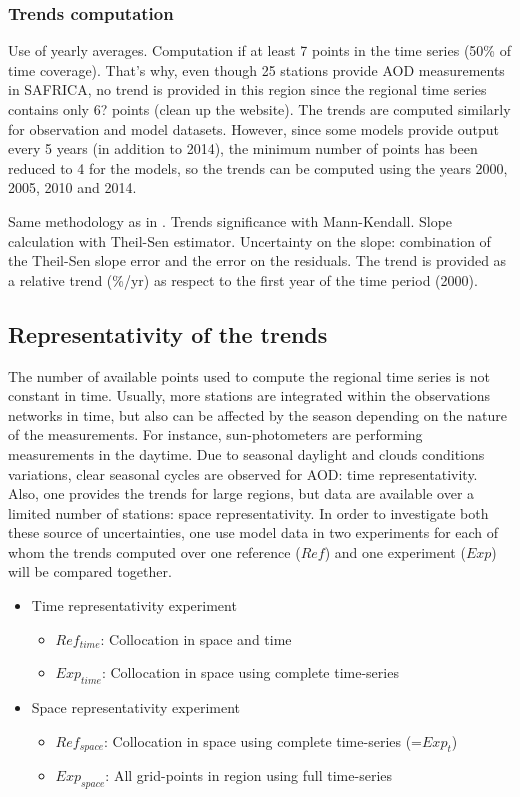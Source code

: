 \documentclass[journal abbreviation, manuscript]{copernicus}
\begin{document}
\subsubsection{Trends computation}
Use of yearly averages. Computation if at least 7 points in the time series (50\% of time coverage). That's why, even though 25 stations provide AOD measurements in SAFRICA, no trend is provided in this region since the regional time series contains only 6? points (clean up the website). The trends are computed similarly for observation and model datasets. However, since some models provide output every 5 years (in addition to 2014), the minimum number of points has been reduced to 4 for the models, so the trends can be computed using the years 2000, 2005, 2010 and 2014.

Same methodology as in \cite{aas2019global}.
Trends significance with Mann-Kendall.
Slope calculation with Theil-Sen estimator.
Uncertainty on the slope: combination of the Theil-Sen slope error and the error on the residuals.
The trend is provided as a relative trend (\%/yr) as respect to the first year of the time period (2000).

\subsection{Representativity of the trends}
The number of available points used to compute the regional time series is not constant in time. Usually, more stations are integrated within the observations networks in time, but also can be affected by the season depending on the nature of the measurements. For instance, sun-photometers are performing measurements in the daytime. Due to seasonal daylight and clouds conditions variations, clear seasonal cycles are observed for AOD: time representativity.
Also, one provides the trends for large regions, but data are available over a limited number of stations: space representativity.
In order to investigate both these source of uncertainties, one use model data in two experiments for each of whom the trends computed over one reference ($Ref$) and one experiment ($Exp$) will be compared together.
\begin{itemize}
 \item Time representativity experiment
       \begin{itemize}
        \item $Ref_{time}$: Collocation in space and time
        \item $Exp_{time}$: Collocation in space using complete time-series
       \end{itemize}
 \item Space representativity experiment
       \begin{itemize}
        \item $Ref_{space}$: Collocation in space using complete time-series (=$Exp_{t}$)
        \item $Exp_{space}$: All grid-points in region using full time-series
       \end{itemize}
\end{itemize}
\end{document}
